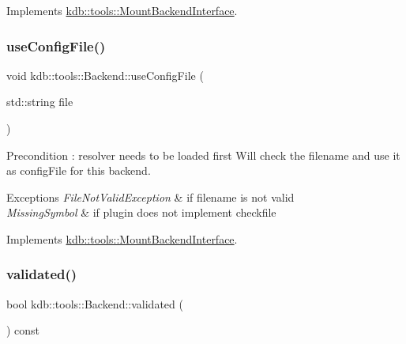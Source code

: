 Implements \hyperlink{classkdb_1_1tools_1_1MountBackendInterface}{kdb\+::tools\+::\+Mount\+Backend\+Interface}.

\mbox{\label{classkdb_1_1tools_1_1Backend_a5c72747e5419d7802849cfc2eb4064d2}} 
\subsubsection{\texorpdfstring{use\+Config\+File()}{useConfigFile()}}
{\footnotesize\ttfamily void kdb\+::tools\+::\+Backend\+::use\+Config\+File (\begin{DoxyParamCaption}\item[{std\+::string}]{file }\end{DoxyParamCaption})\hspace{0.3cm}{\ttfamily [virtual]}}

\begin{DoxyPrecond}{Precondition}
\+: resolver needs to be loaded first Will check the filename and use it as config\+File for this backend. 
\end{DoxyPrecond}

\begin{DoxyExceptions}{Exceptions}
{\em File\+Not\+Valid\+Exception} & if filename is not valid \\
\hline
{\em Missing\+Symbol} & if plugin does not implement \textquotesingle{}checkfile\textquotesingle{} \\
\hline
\end{DoxyExceptions}


Implements \hyperlink{classkdb_1_1tools_1_1MountBackendInterface}{kdb\+::tools\+::\+Mount\+Backend\+Interface}.

\mbox{\label{classkdb_1_1tools_1_1Backend_a7b28929231bc592c1a83f42121405496}} 
\subsubsection{\texorpdfstring{validated()}{validated()}}
{\footnotesize\ttfamily bool kdb\+::tools\+::\+Backend\+::validated (\begin{DoxyParamCaption}{ }\end{DoxyParamCaption}) const\hspace{0.3cm}{\ttfamily [virtual]}}

